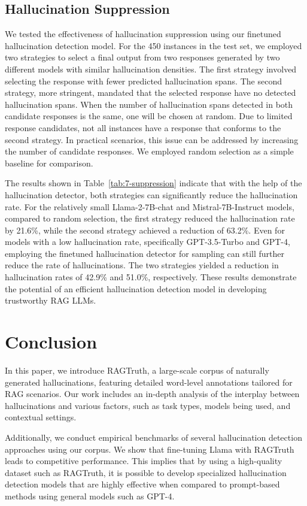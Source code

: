 \documentclass[11pt]{article}
\newcommand{\CorpusName}{RAGTruth}
\begin{document}
\subsection{Hallucination Suppression}
We tested the effectiveness of hallucination suppression using our finetuned hallucination detection model. For the 450 instances in the test set, we employed two strategies to select a final output from two responses generated by two different models with similar hallucination densities. The first strategy involved selecting the response with fewer predicted hallucination spans. The second strategy, more stringent, mandated that the selected response have no detected hallucination spans. When the number of hallucination spans detected in both candidate responses is the same, one will be chosen at random. Due to limited response candidates, not all instances have a response that conforms to the second strategy. In practical scenarios, this issue can be addressed by increasing the number of candidate responses. We employed random selection as a simple baseline for comparison.

The results shown in Table~\ref{tab:7-suppression} indicate that with the help of the hallucination detector, both strategies can significantly reduce the hallucination rate. For the relatively small Llama-2-7B-chat and Mistral-7B-Instruct models, compared to random selection, the first strategy reduced the hallucination rate by 21.6\%, while the second strategy achieved a reduction of 63.2\%. Even for models with a low hallucination rate, specifically GPT-3.5-Turbo and GPT-4, employing the finetuned hallucination detector for sampling can still further reduce the rate of hallucinations. The two strategies yielded a reduction in hallucination rates of 42.9\% and 51.0\%, respectively. These results demonstrate the potential of an efficient hallucination detection model in developing trustworthy RAG LLMs.

\section{Conclusion}
In this paper, we introduce {\CorpusName}, a large-scale corpus of naturally generated hallucinations, featuring detailed word-level annotations tailored for RAG scenarios. Our work includes an in-depth analysis of the interplay between hallucinations and various factors, such as task types, models being used, and contextual settings. 

Additionally, we conduct empirical benchmarks of several hallucination detection approaches using our corpus. We show that fine-tuning Llama with {\CorpusName} leads to competitive performance. This implies that by using a high-quality dataset such as {\CorpusName}, it is possible to develop specialized hallucination detection models that are highly effective when compared to prompt-based methods using general models such as GPT-4. 
\end{document}

